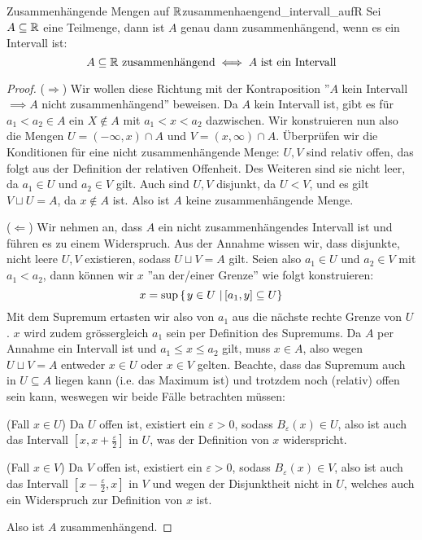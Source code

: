 \begin{satz}{Zusammenhängende Mengen auf $\mathbb{R}$}{zusammenhaengend_intervall_aufR}
Sei $A \subseteq \mathbb{R}$ eine Teilmenge, dann ist $A$ genau dann zusammenhängend, wenn es ein Intervall ist:
$$A \subseteq \mathbb{R} \text{ zusammenhängend} \iff A \text{ ist ein Intervall}$$
\end{satz}
\begin{proof}($\Longrightarrow$) Wir wollen diese Richtung mit der Kontraposition ''$A$ kein Intervall $\implies A$ nicht zusammenhängend'' beweisen. Da $A$ kein Intervall ist, gibt es für $a_1 < a_2 \in A$ ein $X \notin A$ mit $a_1 < x < a_2$ dazwischen. Wir konstruieren nun also die Mengen $U = (-\infty, x) \cap A$ und $V = (x, \infty) \cap A$. Überprüfen wir die Konditionen für eine nicht zusammenhängende Menge: $U,V$ sind relativ offen, das folgt aus der Definition der relativen Offenheit. Des Weiteren sind sie nicht leer, da $a_1 \in U$ und $a_2 \in V$ gilt. Auch sind $U,V$ disjunkt, da $U < V$, und es gilt $V \sqcup U = A$, da $x \notin A$ ist. Also ist $A$ keine zusammenhängende Menge.

($\Longleftarrow$) Wir nehmen an, dass $A$ ein nicht zusammenhängendes Intervall ist und führen es zu einem Widerspruch. Aus der Annahme wissen wir, dass disjunkte, nicht leere $U,V$ existieren, sodass $U \sqcup V = A$ gilt. Seien also $a_1 \in U$ und $a_2 \in V$ mit $a_1 < a_2$, dann können wir $x$ ''an der/einer Grenze'' wie folgt konstruieren:
$$x = \sup \left\{\left.y \in U \ \right| [a_1, y] \subseteq U \right\}$$
Mit dem Supremum ertasten wir also von $a_1$ aus die nächste rechte Grenze von $U$. $x$ wird zudem grössergleich $a_1$ sein per Definition des Supremums. Da $A$ per Annahme ein Intervall ist und $a_1 \leq x \leq a_2$ gilt, muss $x \in A$, also wegen $U \sqcup V = A$ entweder $x \in U$ oder $x \in V$ gelten. Beachte, dass das Supremum auch in $U \subseteq A$ liegen kann (i.e. das Maximum ist) und trotzdem noch (relativ) offen sein kann, weswegen wir beide Fälle betrachten müssen:

(Fall $x \in U$) Da $U$ offen ist, existiert ein $\varepsilon > 0$, sodass $B_\varepsilon(x) \in U$, also ist auch das Intervall $[x, x+\frac{\varepsilon}{2}]$ in $U$, was der Definition von $x$ widerspricht.

(Fall $x \in V$) Da $V$ offen ist, existiert ein $\varepsilon > 0$, sodass $B_\varepsilon(x) \in V$, also ist auch das Intervall $[x-\frac{\varepsilon}{2}, x]$ in $V$ und wegen der Disjunktheit nicht in $U$, welches auch ein Widerspruch zur Definition von $x$ ist.

Also ist $A$ zusammenhängend.
\end{proof}

